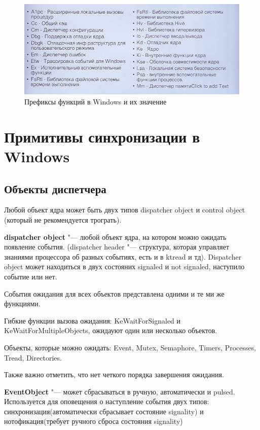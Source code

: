 \documentclass[bachelor, och, book]{SCWorks}
\theoremstyle{remark}
\begin{document}
    \begin{figure}[H]
        \begin{center}
            \includegraphics[scale=0.6]{res/prefix-function-windows.png}
            \caption{Префиксы функций в Windows и их значение}
        \end{center}
    \end{figure}

    \section{Примитивы синхронизации в Windows}

    \subsection{Объекты диспетчера}

    Любой объект ядра может быть двух типов dispatcher object и control object (который не рекомендуется трограть). 

    \textbf{dispatcher object} "--- любой объект ядра, на котором можно ожидать появление события. (dispatcher header "--- структура, которая управляет знаниями процессора об разных событиях, есть и в ktread и тд). Dispatcher object может находиться в двух состояних signaled и not signaled, наступило событие или нет.

    События ожидания для всех объектов представлена одними и те ми же функциями.

    Гибкие функции вызова ожидания: KeWaitForSignaled и KeWaitForMultipleObjects, ожидауют один или несколько объектов.

    Объекты, которые можно ожидать: Event, Mutex, Semaphore, Timers, Processes, Tread, Directories.

    Также важно отметить, что нет четкого порядка завершения ожидания.

    \textbf{EventObject} "--- может сбрасываться в ручную, автоматически и pulsed. Используется для оповещения о наступление события двух типов: синхронизация(автоматически сбрасывает состояние signality) и нотофикация(требует ручного сброса состояния signality)
\end{document}
